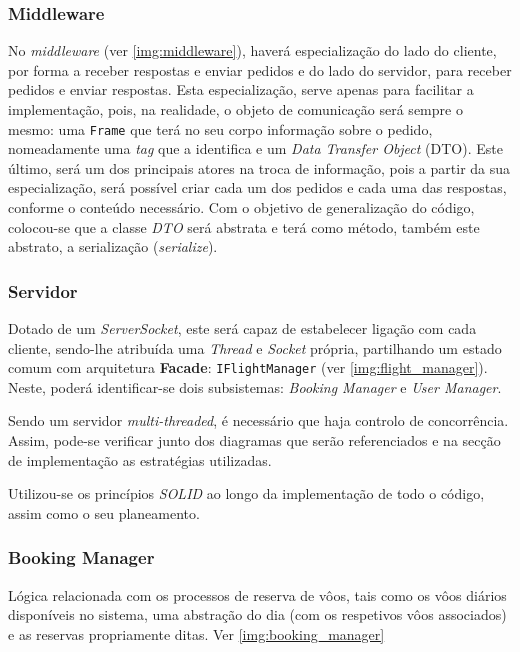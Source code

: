 \documentclass[a4paper,11pt]{article}
\begin{document}
\subsubsection{Middleware}

No \textit{middleware} (ver \ref{img:middleware}), haverá especialização do lado do cliente, por forma a receber respostas e enviar pedidos e
do lado do servidor, para receber pedidos e enviar respostas.
Esta especialização, serve apenas para facilitar a implementação, pois, na realidade, o objeto de comunicação
será sempre o mesmo: uma \texttt{Frame} que terá no seu corpo informação sobre o pedido, nomeadamente
uma \textit{tag} que a identifica e um \textit{Data Transfer Object} (DTO).
Este último, será um dos principais atores na troca de informação, pois a partir da sua especialização,
será possível criar cada um dos pedidos e cada uma das respostas, conforme o conteúdo necessário.
Com o objetivo de generalização do código, colocou-se que a classe \textit{DTO} será abstrata e terá como método,
também este abstrato, a serialização (\textit{serialize}).

\subsubsection{Servidor}
Dotado de um \textit{ServerSocket}, este será capaz de estabelecer ligação com cada cliente,
sendo-lhe atribuída uma \textit{Thread} e \textit{Socket} própria, partilhando um estado comum com arquitetura \textbf{Facade}: 
\texttt{IFlightManager} (ver \ref{img:flight_manager}).
Neste, poderá identificar-se dois subsistemas: \textit{Booking Manager} e \textit{User Manager}.

Sendo um servidor \textit{multi-threaded}, é necessário que haja controlo de concorrência.
Assim, pode-se verificar junto dos diagramas que serão referenciados e na secção de implementação
as estratégias utilizadas.

Utilizou-se os princípios \textit{SOLID} \cite{wiki:solid} ao longo da implementação de todo o código,
assim como o seu planeamento.

\subsubsection{Booking Manager}

Lógica relacionada com os processos de reserva de vôos, tais como os vôos diários disponíveis
no sistema, uma abstração do dia (com os respetivos vôos associados) e as reservas propriamente ditas.
Ver \ref{img:booking_manager}
\end{document}
